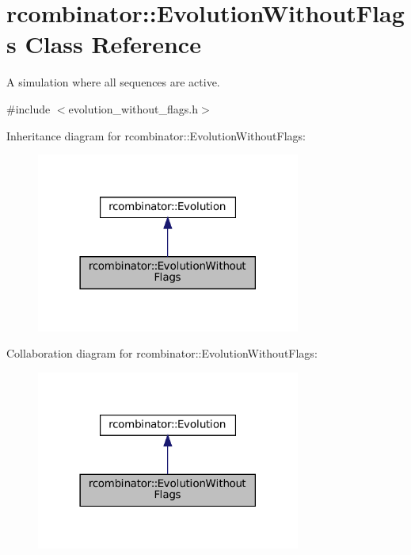 \hypertarget{classrcombinator_1_1EvolutionWithoutFlags}{}\section{rcombinator\+:\+:Evolution\+Without\+Flags Class Reference}
\label{classrcombinator_1_1EvolutionWithoutFlags}


A simulation where all sequences are active.  




{\ttfamily \#include $<$evolution\+\_\+without\+\_\+flags.\+h$>$}



Inheritance diagram for rcombinator\+:\+:Evolution\+Without\+Flags\+:
\nopagebreak
\begin{figure}[H]
\begin{center}
\leavevmode
\includegraphics[width=246pt]{classrcombinator_1_1EvolutionWithoutFlags__inherit__graph}
\end{center}
\end{figure}


Collaboration diagram for rcombinator\+:\+:Evolution\+Without\+Flags\+:
\nopagebreak
\begin{figure}[H]
\begin{center}
\leavevmode
\includegraphics[width=246pt]{classrcombinator_1_1EvolutionWithoutFlags__coll__graph}
\end{center}
\end{figure}
